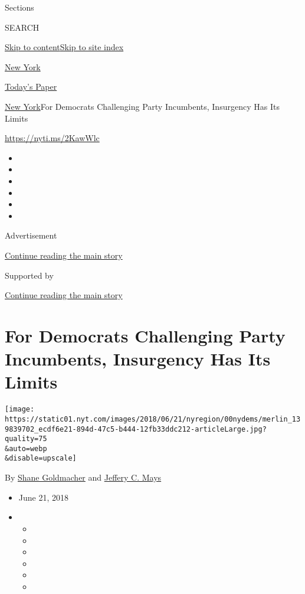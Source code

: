 Sections

SEARCH

\protect\hyperlink{site-content}{Skip to
content}\protect\hyperlink{site-index}{Skip to site index}

\href{https://www.nytimes.com/section/nyregion}{New York}

\href{https://myaccount.nytimes.com/auth/login?response_type=cookie\&client_id=vi}{}

\href{https://www.nytimes.com/section/todayspaper}{Today's Paper}

\href{/section/nyregion}{New York}\textbar{}For Democrats Challenging
Party Incumbents, Insurgency Has Its Limits

\url{https://nyti.ms/2KawWlc}

\begin{itemize}
\item
\item
\item
\item
\item
\item
\end{itemize}

Advertisement

\protect\hyperlink{after-top}{Continue reading the main story}

Supported by

\protect\hyperlink{after-sponsor}{Continue reading the main story}

\hypertarget{for-democrats-challenging-party-incumbents-insurgency-has-its-limits}{%
\section{For Democrats Challenging Party Incumbents, Insurgency Has Its
Limits}\label{for-democrats-challenging-party-incumbents-insurgency-has-its-limits}}

\texttt{[image: https://static01.nyt.com/images/2018/06/21/nyregion/00nydems/merlin\_139839702\_ecdf6e21-894d-47c5-b444-12fb33ddc212-articleLarge.jpg?quality=75\\\&auto=webp\\\&disable=upscale]}

By \href{https://www.nytimes.com/by/shane-goldmacher}{Shane Goldmacher}
and \href{https://www.nytimes.com/by/jeffery-c-mays}{Jeffery C. Mays}

\begin{itemize}
\item
  June 21, 2018
\item
  \begin{itemize}
  \item
  \item
  \item
  \item
  \item
  \item
  \end{itemize}
\end{itemize}

